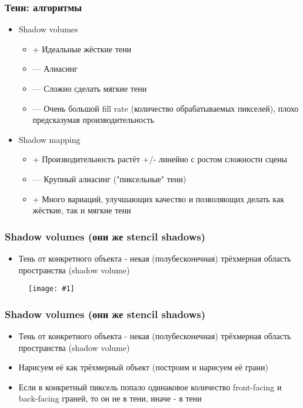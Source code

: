 \documentclass{beamer}
\newcommand{\slideimage}[1]{
  \begin{figure}
    \begin{adjustbox}{width=\textwidth, totalheight=\textheight-2\baselineskip-2\baselineskip,keepaspectratio}
      \texttt{[image: \#1]}
    \end{adjustbox}
  \end{figure}
}
\begin{document}
\begin{frame}[fragile]
\frametitle{Тени: алгоритмы}
\begin{itemize}
\item Shadow volumes
\pause
\begin{itemize}
\item {\color{green}+} Идеальные жёсткие тени
\item {\color{red}---} Алиасинг
\item {\color{red}---} Сложно сделать мягкие тени
\item {\color{red}---} Очень большой fill rate (количество обрабатываемых пикселей), плохо предсказумая производительность
\end{itemize}
\pause
\item Shadow mapping
\pause
\begin{itemize}
\item {\color{green}+} Производительность растёт +/- линейно с ростом сложности сцены
\item {\color{red}---} Крупный алиасинг ("пиксельные" тени)
\item {\color{green}+} Много вариаций, улучшающих качество и позволяющих делать как жёсткие, так и мягкие тени
\end{itemize}
\end{itemize}
\end{frame}

\begin{frame}[fragile]
\frametitle{Shadow volumes (они же stencil shadows)}
\begin{itemize}
\item Тень от конкретного объекта - некая (полубесконечная) трёхмерная область пространства (shadow volume)
\end{itemize}
\slideimage{shadow-volume.png}
\end{frame}

\begin{frame}[fragile]
\frametitle{Shadow volumes (они же stencil shadows)}
\begin{itemize}
\item Тень от конкретного объекта - некая (полубесконечная) трёхмерная область пространства (shadow volume)
\pause
\item Нарисуем её как трёхмерный объект (построим и нарисуем её грани)
\pause
\item Если в конкретный пиксель попало одинаковое количество front-facing и back-facing граней, то он не в тени, иначе - в тени
\end{itemize}
\end{frame}
\end{document}
